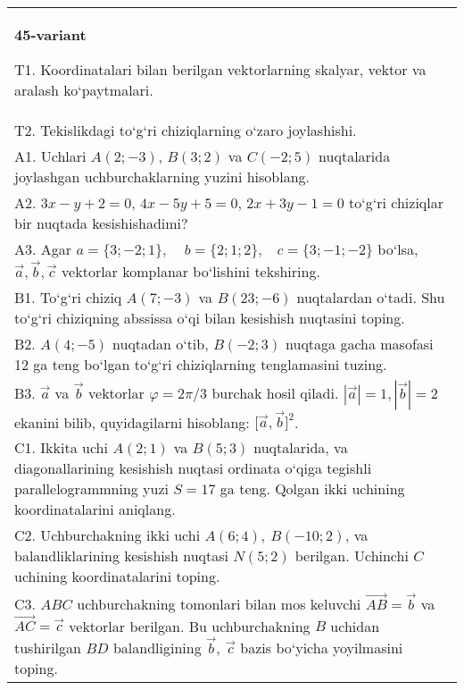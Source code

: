 \documentclass{article}
\begin{document}
\begin{tabular}{m{17cm}}
\textbf{45-variant}
\newline

T1. 
Koordinatalari bilan berilgan vektorlarning skalyar, vektor va aralash ko‘paytmalari. \\
T2. 
Tekislikdagi to‘g‘ri chiziqlarning o‘zaro joylashishi.
 \\
A1. 
Uchlari $A (2;-3) $, $B (3;2) $ va $C (-2;5) $
nuqtalarida joylashgan uchburchaklarning yuzini hisoblang.
 \\
A2. 
$3x-y+2=0$, $4x-5y+5=0$, $2x+3y-1=0$
to‘g‘ri chiziqlar bir nuqtada kesishishadimi?
 \\
A3. 
Agar \(a = \{ 3; - 2;1\},\ \ \ \ \ b = \{ 2;1;2\},\ \ \ \ c = \{ 3; - 1; - 2\}\) bo‘lsa, $\overrightarrow{a}, \overrightarrow{b}, \overrightarrow{c}$ vektorlar komplanar bo‘lishini tekshiring.
 \\
B1. 
To‘g‘ri chiziq \(A (7;-3) \) va \(B (23;-6) \) nuqtalardan o‘tadi.
Shu to‘g‘ri chiziqning abssissa o‘qi bilan kesishish nuqtasini toping.
 \\
B2. 
\(A (4;-5) \) nuqtadan o‘tib, \(B (-2;3) \) nuqtaga
gacha masofasi 12 ga teng bo‘lgan to‘g‘ri chiziqlarning tenglamasini tuzing.
 \\
B3. 
$\vec{a}$ va $\vec{b}$ vektorlar $\varphi = 2\pi/3$ burchak hosil qiladi. $|\vec{a}| = 1,|\vec{b}| = 2$ ekanini bilib, quyidagilarni hisoblang:
$\lbrack\vec{a},\vec{b}\rbrack^{2}$.
 \\
C1. 
Ikkita uchi \(A (2;1) \) va \(B (5; 3) \) nuqtalarida, va
diagonallarining kesishish nuqtasi ordinata o‘qiga tegishli
parallelogrammning yuzi \(S = 17\) ga teng. Qolgan ikki uchining
koordinatalarini aniqlang. \\
C2. 
Uchburchakning ikki uchi \(A (6;4),\ B (- 10;2) \), va
balandliklarining kesishish nuqtasi \(N (5;2) \) berilgan. Uchinchi $C$
uchining koordinatalarini toping.
 \\
C3. 
\(ABC\) uchburchakning tomonlari bilan mos keluvchi \(\vec{AB} = \vec{b}\) va \(\vec{AC} = \vec{c}\) vektorlar berilgan. Bu uchburchakning \(B\) uchidan tushirilgan \(BD\) balandligining \(\vec{b},\ \vec{c}\) bazis bo‘yicha yoyilmasini toping.
 \\

\end{tabular}
\vspace{1cm}
\end{document}
